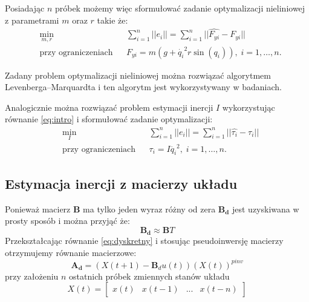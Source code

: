 \documentclass[a4paper, 10pt]{article}
\begin{document}
Posiadając $n$ próbek możemy więc sformułować zadanie optymalizacji nieliniowej z parametrami $m$ oraz $r$ takie że:
\begin{equation}
\begin{aligned}
& \underset{m, r}{\text{min}}
& & \sum_{i = 1}^{n} || e_i || = \sum_{i = 1}^{n} || \hat{F_{yi}} - F_{yi} || \\
& \text{przy ograniczeniach}
& & F_{yi} = m(g + \dot{q_i}^2r\sin{(q_i)}), \; i = 1, \ldots, n.
\end{aligned}
\end{equation}

Zadany problem optymalizacji nieliniowej można rozwiązać algorytmem Levenberga–Marquardta i ten algorytm jest wykorzystywany w badaniach.

Analogicznie można rozwiązać problem estymacji inercji $I$ wykorzystując równanie \ref{eq:intro} i sformułować zadanie optymalizacji:
\begin{equation}
\begin{aligned}
& \underset{I}{\text{min}}
& & \sum_{i = 1}^{n} || e_i || = \sum_{i = 1}^{n} || \hat{\tau_{i}} - \tau_{i} || \\
& \text{przy ograniczeniach}
& & \tau_{i} = I\ddot{q_i}^2, \; i = 1, \ldots, n.
\end{aligned}
\end{equation}


\subsection{Estymacja inercji z macierzy układu}
\label{sec:pos}
Ponieważ macierz $\mathbf{B}$ ma tylko jeden wyraz różny od zera $\mathbf{B_d}$ jest uzyskiwana w prosty sposób i można przyjąć że:
\begin{equation}
\mathbf{B_d} \approx \mathbf{B}T
\end{equation}
Przekształcając równanie \ref{eq:dyskretny} i stosując pseudoinwersję macierzy otrzymujemy równanie macierzowe:
\begin{equation}
\mathbf{A_d} = (X(t+1) - \mathbf{B}_du(t))(X(t))^{pinv}
\label{eq:pinv}
\end{equation}
przy założeniu $n$ ostatnich próbek zmiennych stanów układu
\begin{equation}
X(t) = 	\begin{bmatrix}
x(t) & x(t-1)  & ... & x(t-n)
\end{bmatrix}
\label{eq:xk}
\end{equation}
\end{document}
